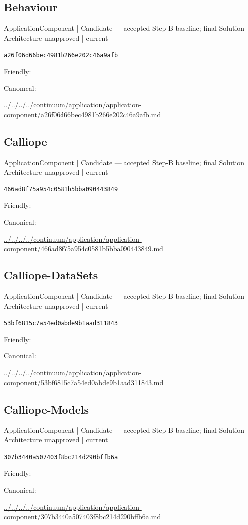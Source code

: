 \documentclass[10pt,a4paper]{article}
\begin{document}
\subsection*{Behaviour}
{\small ApplicationComponent | Candidate — accepted Step-B baseline; final Solution Architecture unapproved | current}\par
\texttt{a26f06d66bec4981b266e202c46a9afb}\par
Friendly: \par
Canonical: \par
{\footnotesize\url{../../../../continuum/application/application-component/a26f06d66bec4981b266e202c46a9afb.md}}\par
\subsection*{Calliope}
{\small ApplicationComponent | Candidate — accepted Step-B baseline; final Solution Architecture unapproved | current}\par
\texttt{466ad8f75a954c0581b5bba090443849}\par
Friendly: \par
Canonical: \par
{\footnotesize\url{../../../../continuum/application/application-component/466ad8f75a954c0581b5bba090443849.md}}\par
\subsection*{Calliope-DataSets}
{\small ApplicationComponent | Candidate — accepted Step-B baseline; final Solution Architecture unapproved | current}\par
\texttt{53bf6815c7a54ed0abde9b1aad311843}\par
Friendly: \par
Canonical: \par
{\footnotesize\url{../../../../continuum/application/application-component/53bf6815c7a54ed0abde9b1aad311843.md}}\par
\subsection*{Calliope-Models}
{\small ApplicationComponent | Candidate — accepted Step-B baseline; final Solution Architecture unapproved | current}\par
\texttt{307b3440a507403f8bc214d290bffb6a}\par
Friendly: \par
Canonical: \par
{\footnotesize\url{../../../../continuum/application/application-component/307b3440a507403f8bc214d290bffb6a.md}}\par
\end{document}
